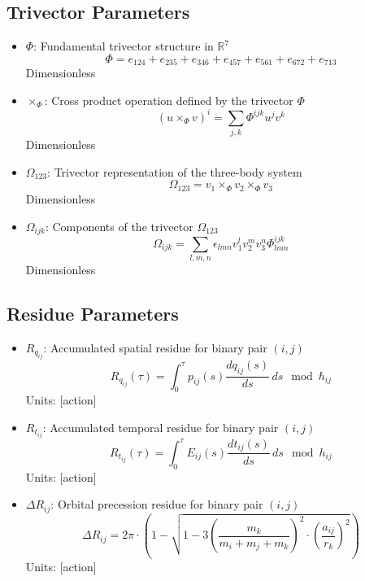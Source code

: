 \documentclass{article}
\begin{document}
\subsection{Trivector Parameters}

\begin{itemize}
\item $\Phi$: Fundamental trivector structure in $\mathbb{R}^7$
    \begin{equation}
    \Phi = e_{124} + e_{235} + e_{346} + e_{457} + e_{561} + e_{672} + e_{713}
    \end{equation}
    Dimensionless
    
\item $\times_\Phi$: Cross product operation defined by the trivector $\Phi$
    \begin{equation}
    (u \times_\Phi v)^i = \sum_{j,k} \Phi^{ijk} u^j v^k
    \end{equation}
    Dimensionless
    
\item $\Omega_{123}$: Trivector representation of the three-body system
    \begin{equation}
    \Omega_{123} = v_1 \times_\Phi v_2 \times_\Phi v_3
    \end{equation}
    Dimensionless
    
\item $\Omega_{ijk}$: Components of the trivector $\Omega_{123}$
    \begin{equation}
    \Omega_{ijk} = \sum_{l,m,n} \epsilon_{lmn} v_1^l v_2^m v_3^n \Phi^{ijk}_{lmn}
    \end{equation}
    Dimensionless
\end{itemize}

\subsection{Residue Parameters}

\begin{itemize}
\item $R_{q_{ij}}$: Accumulated spatial residue for binary pair $(i,j)$
    \begin{equation}
    R_{q_{ij}}(\tau) = \int_0^\tau p_{ij}(s) \frac{dq_{ij}(s)}{ds} \, ds \mod \hbar_{ij}
    \end{equation}
    Units: [action]
    
\item $R_{t_{ij}}$: Accumulated temporal residue for binary pair $(i,j)$
    \begin{equation}
    R_{t_{ij}}(\tau) = \int_0^\tau E_{ij}(s) \frac{dt_{ij}(s)}{ds} \, ds \mod h_{ij}
    \end{equation}
    Units: [action]
    
\item $\Delta R_{ij}$: Orbital precession residue for binary pair $(i,j)$
    \begin{equation}
    \Delta R_{ij} = 2\pi \cdot (1 - \sqrt{1-3\left(\frac{m_k}{m_i+m_j+m_k}\right)^2 \cdot \left(\frac{a_{ij}}{r_k}\right)^2})
    \end{equation}
    Units: [action]
\end{itemize}
\end{document}

